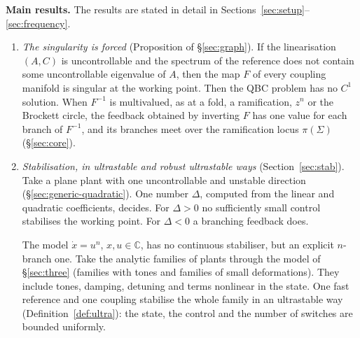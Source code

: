 \documentclass[11pt,reqno]{amsart}
\theoremstyle{plain}
\theoremstyle{definition}
\theoremstyle{remark}
\newcommand{\C}{\mathbb{C}}
\newcommand{\Sig}{\Sigma}
\begin{document}
\medskip
\noindent\textbf{Main results.} The results are stated in detail in Sections~\ref{sec:setup}--\ref{sec:frequency}.
\begin{enumerate}
\item[(1)] \emph{The singularity is forced} (Proposition of \S\ref{sec:graph}). If the linearisation $(A,C)$ is
  uncontrollable and the spectrum of the reference does not contain some uncontrollable eigenvalue of $A$, then the map $F$ of
  every coupling manifold is singular at the working point. Then the QBC problem has no $C^1$ solution. When
  $F^{-1}$ is multivalued, as at a fold, a ramification, $z^n$ or the Brockett circle, the feedback obtained by
  inverting $F$ has one value for each branch of $F^{-1}$, and its branches meet over the ramification locus $\pi(\Sig)$ (\S\ref{sec:core}).
\item[(2)] \emph{Stabilisation, in ultrastable and robust ultrastable ways} (Section~\ref{sec:stab}). Take a plane plant with one uncontrollable and unstable direction (\S\ref{sec:generic-quadratic}). One number $\Delta$, computed from the linear and quadratic coefficients, decides. For $\Delta>0$ no sufficiently small control stabilises the working point. For $\Delta<0$ a branching feedback does.

The model $\dot x=u^{n}$, $x,u\in\C$, has no continuous stabiliser, but an explicit $n$-branch one. Take the analytic families of plants through the model of \S\ref{sec:three} (families with tones and families of small deformations). They include tones, damping, detuning and terms nonlinear in the state. One fast reference and one coupling stabilise the whole family in an ultrastable way (Definition~\ref{def:ultra}): the state, the control and the number of switches are bounded uniformly.


\end{enumerate}
\end{document}
